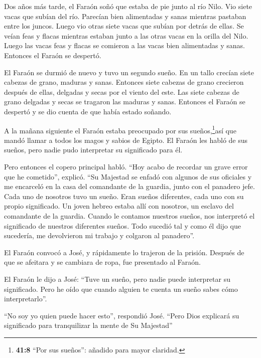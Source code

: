  Dos años más tarde, el Faraón soñó que estaba de pie junto
al río Nilo.  Vio siete vacas que subían del río. Parecían
bien alimentadas y sanas mientras pastaban entre los juncos.
 Luego vio otras siete vacas que subían por detrás de ellas.
Se veían feas y flacas mientras estaban junto a las otras vacas en la
orilla del Nilo.  Luego las vacas feas y flacas se comieron
a las vacas bien alimentadas y sanas. Entonces el Faraón se despertó.

 El Faraón se durmió de nuevo y tuvo un segundo sueño. En un
tallo crecían siete cabezas de grano, maduras y sanas. 
Entonces siete cabezas de grano crecieron después de ellas, delgadas y
secas por el viento del este.  Las siete cabezas de grano
delgadas y secas se tragaron las maduras y sanas. Entonces el Faraón se
despertó y se dio cuenta de que había estado soñando.

 A la mañana siguiente el Faraón estaba preocupado por sus
sueños,\footnote{\textbf{41:8} ``Por sus sueños'': añadido para mayor
  claridad.}así que mandó llamar a todos los magos y sabios de Egipto.
El Faraón les habló de sus sueños, pero nadie pudo interpretar su
significado para él.

 Pero entonces el copero principal habló. ``Hoy acabo de
recordar un grave error que he cometido'', explicó.  ``Su
Majestad se enfadó con algunos de sus oficiales y me encarceló en la
casa del comandante de la guardia, junto con el panadero jefe.
 Cada uno de nosotros tuvo un sueño. Eran sueños
diferentes, cada uno con su propio significado.  Un joven
hebreo estaba allí con nosotros, un esclavo del comandante de la
guardia. Cuando le contamos nuestros sueños, nos interpretó el
significado de nuestros diferentes sueños.  Todo sucedió
tal y como él dijo que sucedería, me devolvieron mi trabajo y colgaron
al panadero''.

 El Faraón convocó a José, y rápidamente lo trajeron de la
prisión. Después de que se afeitara y se cambiara de ropa, fue
presentado al Faraón.

 El Faraón le dijo a José: ``Tuve un sueño, pero nadie
puede interpretar su significado. Pero he oído que cuando alguien te
cuenta un sueño sabes cómo interpretarlo''.

 ``No soy yo quien puede hacer esto'', respondió José.
``Pero Dios explicará su significado para tranquilizar la mente de Su
Majestad''

